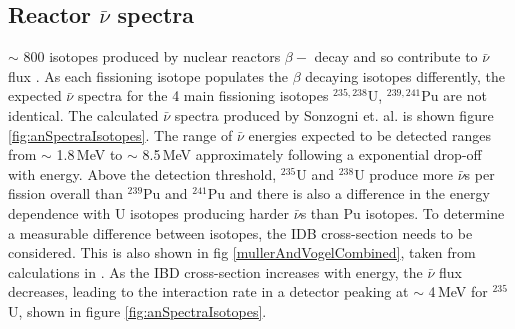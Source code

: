 \subsection{Reactor $\bar{\nu}$ spectra}
$\sim$ 800 isotopes produced by nuclear reactors $\beta-$ decay and so contribute to $\bar{\nu}$ flux \cite{sonzogni_nucStrcutre_2015}. As each fissioning isotope populates the $\beta$ decaying isotopes differently, the expected $\bar{\nu}$ spectra for the 4 main fissioning isotopes $^{235,238}$U, $^{239,241}$Pu are not identical. The calculated $\bar{\nu}$ spectra produced by Sonzogni et. al. \cite{sonzogni_nucStrcutre_2015} is shown figure \ref{fig:anSpectraIsotopes}. The range of $\bar{\nu}$ energies expected to be detected ranges from $\sim$ 1.8\,MeV to $\sim$ 8.5\,MeV approximately following a exponential drop-off with energy. Above the detection threshold, $^{235}$U and $^{238}$U produce more $\bar{\nu}$s per fission overall than $^{239}$Pu and $^{241}$Pu and there is also a difference in the energy dependence with U isotopes producing harder $\bar{\nu}$s than Pu isotopes. To determine a measurable difference between isotopes, the IDB cross-section needs to be considered. This is also shown in fig \ref{mullerAndVogelCombined}, taken from calculations in \cite{Vogel_1999}. As the IBD cross-section increases with energy, the $\bar{\nu}$ flux decreases, leading to the interaction rate in a detector peaking at $\sim$ 4\,MeV for $^{235}$U, shown in figure \ref{fig:anSpectraIsotopes}.

